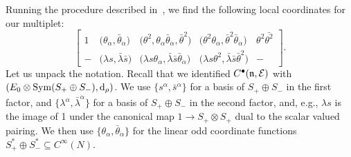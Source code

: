 \documentclass[pdftex]{sigma}
\numberwithin{equation}{section}
\def\d{{\rm d}}
\DeclareMathOperator{\Sym}{Sym}
\begin{document}
Running the procedure described in~\cite{perspectives}, we find the following local coordinates for our multiplet:
\begin{equation*} %
\begin{bmatrix}
1 & \big(\theta_\alpha,\bar{\theta}_{\dot \alpha}\big) & \big(\theta^2 , \theta_\alpha \bar{\theta}_{\dot \alpha}, \bar{\theta}^2\big) & \big(\theta^2 \theta_\alpha , \bar{\theta}^2 \bar{\theta}_{\dot \alpha}\big) & \theta^2 \bar{\theta^2} \\
- & \big(\lambda s , \bar{\lambda} \bar{s}\big) & \big(\lambda s \theta_\alpha , \bar{\lambda} \bar{s} \bar{\theta}_{\dot \alpha}\big) & \big(\lambda s \theta^2 , \bar{\lambda} \bar{s} \bar{\theta}^2\big) & -
\end{bmatrix}.
\end{equation*}
Let us unpack the notation. Recall that we identified $C^\bullet(\mathfrak n, \mathcal E)$ with $(E_0 \otimes \Sym(S_+ \oplus S_-), \d_\rho)$. We use $\big\{s^\alpha, \bar s^{\dot \alpha}\big\}$ for a basis of $S_+ \oplus S_-$ in the first factor, and $\{\lambda^\alpha, \bar \lambda^{\dot \alpha}\}$ for a basis of $S_+ \oplus S_-$ in the second factor, and, e.g., $\lambda s$ is the image of 1 under the canonical map $1 \to S_+ \otimes S_+$ dual to the scalar valued pairing. We then use $\big\{\theta_\alpha, \bar \theta_{\dot \alpha}\big\}$ for the linear odd coordinate functions $S_+^* \oplus S_-^* \subseteq C^\infty(N)$.
\end{document}
